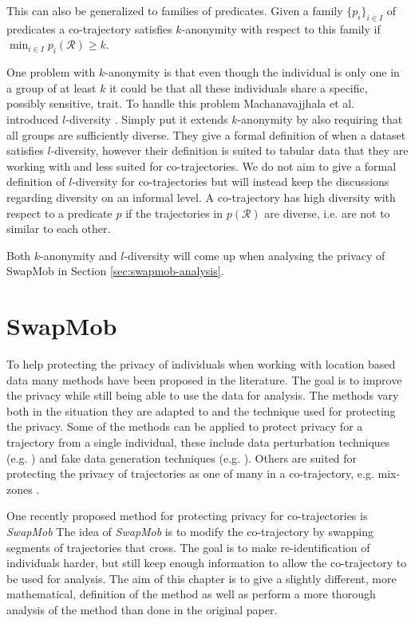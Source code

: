 \documentclass[12pt]{article}
\newcommand{\cotraj}{\mathcal{R}}
\newcommand{\pred}{p}
\theoremstyle{definition}
\begin{document}
This can also be generalized to families of predicates. Given a family
\(\{\pred_{i}\}_{i \in I}\) of predicates a co-trajectory satisfies
\(k\)-anonymity with respect to this family if
\(\min_{i \in I}\pred_{i}(\cotraj) \geq k\).

One problem with \(k\)-anonymity is that even though the individual is
only one in a group of at least \(k\) it could be that all these
individuals share a specific, possibly sensitive, trait. To handle
this problem Machanavajjhala et al. introduced \(l\)-diversity
\cite{machanavajjhala_l-diversity:_2006}. Simply put it extends
\(k\)-anonymity by also requiring that all groups are sufficiently
diverse. They give a formal definition of when a dataset satisfies
\(l\)-diversity, however their definition is suited to tabular data
that they are working with and less suited for co-trajectories. We do
not aim to give a formal definition of \(l\)-diversity for
co-trajectories but will instead keep the discussions regarding
diversity on an informal level. A co-trajectory has high diversity
with respect to a predicate \(\pred\) if the trajectories in
\(\pred(\cotraj)\) are diverse, i.e. are not to similar to each other.

Both \(k\)-anonymity and \(l\)-diversity will come up when analysing
the privacy of SwapMob in Section \ref{sec:swapmob-analysis}.

\section{SwapMob}
\label{sec:swapmob}
To help protecting the privacy of individuals when working with
location based data many methods have been proposed in the literature.
The goal is to improve the privacy while still being able to use the
data for analysis. The methods vary both in the situation they are
adapted to and the technique used for protecting the privacy. Some of
the methods can be applied to protect privacy for a trajectory from a
single individual, these include data perturbation techniques (e.g.
\cite{andres_geo-indistinguishability:_2013, ghinita_prive:_2007,
  jiang_publishing_2013}) and fake data generation techniques (e.g.
\cite{quercia_spotme_2011, pelekis_privacy-aware_2011,
  kido_protection_2005}). Others are suited for protecting the privacy
of trajectories as one of many in a co-trajectory, e.g. mix-zones
\cite{beresford_location_2003, beresford_mix_2004}.

One recently proposed method for protecting privacy for
co-trajectories is \emph{SwapMob} The idea of \emph{SwapMob} is to
modify the co-trajectory by swapping segments of trajectories that
cross. The goal is to make re-identification of individuals harder,
but still keep enough information to allow the co-trajectory to be
used for analysis. The aim of this chapter is to give a slightly
different, more mathematical, definition of the method as well as
perform a more thorough analysis of the method than done in the
original paper.
\end{document}
